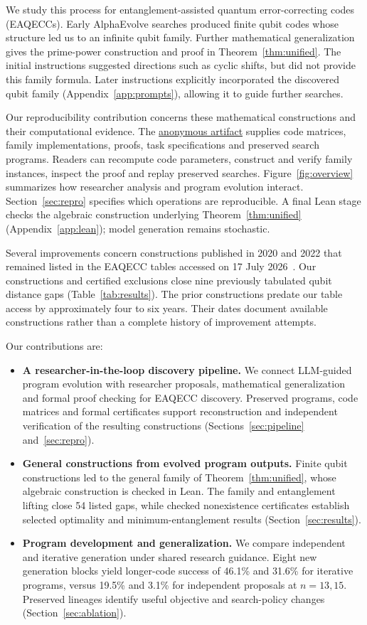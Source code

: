 \documentclass{article}
\newcommand{\artifactlink}{\href{https://anonymous.4open.science/r/llm_guided_EAQECC_search-4099}{anonymous artifact}}
\begin{document}
We study this process for entanglement-assisted quantum error-correcting
codes (EAQECCs). Early AlphaEvolve searches produced finite qubit codes
whose structure led us to an infinite qubit family. Further mathematical
generalization gives the prime-power construction and proof in
Theorem~\ref{thm:unified}. The initial instructions suggested directions
such as cyclic shifts, but did not provide this family formula.
Later instructions explicitly incorporated the discovered qubit family
(Appendix~\ref{app:prompts}), allowing it to guide further searches.

Our reproducibility contribution concerns these mathematical
constructions and their computational evidence. The \artifactlink{} supplies
code matrices, family implementations, proofs, task specifications and
preserved search programs. Readers can recompute code parameters,
construct and verify family instances, inspect the proof and replay
preserved searches. Figure~\ref{fig:overview} summarizes how researcher
analysis and program evolution interact. Section~\ref{sec:repro}
specifies which operations are reproducible. A final Lean stage checks
the algebraic construction underlying Theorem~\ref{thm:unified} (Appendix~\ref{app:lean}); model generation
remains stochastic.

Several improvements concern constructions published in 2020 and 2022
that remained listed in the EAQECC tables accessed on 17 July
2026~\citep{GHW2020,Luo2022}. Our constructions and certified exclusions
close nine previously tabulated qubit distance gaps (Table~\ref{tab:results}).
The prior constructions predate our table access by approximately four
to six years. Their dates document available constructions rather than
a complete history of improvement attempts.

Our contributions are:
\begin{itemize}\setlength{\itemsep}{1pt}
\item \textbf{A researcher-in-the-loop discovery pipeline.}
  We connect LLM-guided program evolution with researcher proposals,
  mathematical generalization and formal proof checking for EAQECC
  discovery. Preserved programs, code matrices and formal certificates
  support reconstruction and independent verification of the resulting
  constructions (Sections~\ref{sec:pipeline} and~\ref{sec:repro}).
\item \textbf{General constructions from evolved program outputs.}
  Finite qubit constructions led to the general family of
  Theorem~\ref{thm:unified}, whose algebraic construction is checked in Lean.
  The family and entanglement lifting close 54 listed gaps, while checked
  nonexistence certificates establish selected optimality and
  minimum-entanglement results (Section~\ref{sec:results}).
\item \textbf{Program development and generalization.} We compare
  independent and iterative generation under shared research guidance.
  Eight new generation blocks yield longer-code success of 46.1\% and
  31.6\% for iterative programs, versus 19.5\% and 3.1\% for independent
  proposals at $n=13,15$. Preserved lineages identify useful objective and
  search-policy changes (Section~\ref{sec:ablation}).
\end{itemize}
\end{document}
